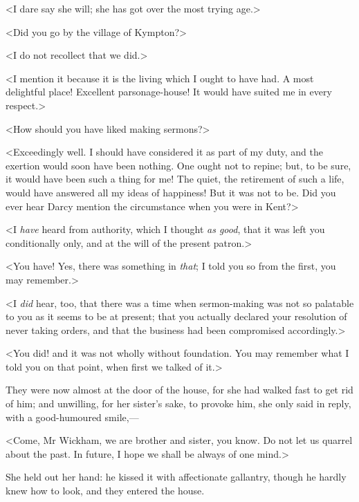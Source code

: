 <I dare say she will; she has got over the most trying age.>

<Did you go by the village of Kympton?>

<I do not recollect that we did.>

<I mention it because it is the living which I ought to have had. A most delightful place! Excellent parsonage-house! It would have suited me in every respect.>

<How should you have liked making sermons?>

<Exceedingly well. I should have considered it as part of my duty, and the exertion would soon have been nothing. One ought not to repine; but, to be sure, it would have been such a thing for me! The quiet, the retirement of such a life, would have answered all my ideas of happiness! But it was not to be. Did you ever hear Darcy mention the circumstance when you were in Kent?>

<I \textit{have} heard from authority, which I thought \textit{as good}, that it was left you conditionally only, and at the will of the present patron.>

<You have! Yes, there was something in \textit{that}; I told you so from the first, you may remember.>

<I \textit{did} hear, too, that there was a time when sermon-making was not so palatable to you as it seems to be at present; that you actually declared your resolution of never taking orders, and that the business had been compromised accordingly.>

<You did! and it was not wholly without foundation. You may remember what I told you on that point, when first we talked of it.>

They were now almost at the door of the house, for she had walked fast to get rid of him; and unwilling, for her sister's sake, to provoke him, she only said in reply, with a good-humoured smile,—

<Come, Mr Wickham, we are brother and sister, you know. Do not let us quarrel about the past. In future, I hope we shall be always of one mind.>

She held out her hand: he kissed it with affectionate gallantry, though he hardly knew how to look, and they entered the house.